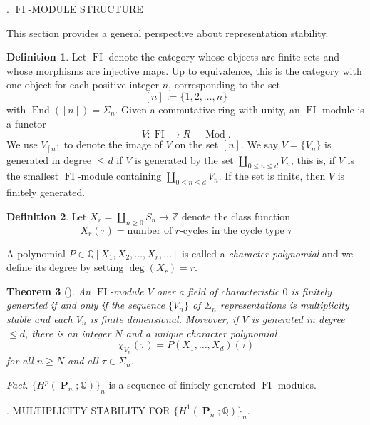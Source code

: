 \documentclass[11pt, letterpaper, notitlepage, oneside]{amsart}
\DeclareMathOperator{\End}{\mathrm{End}}
\DeclareMathOperator{\Mod}{\mathrm{Mod}}
\DeclareMathOperator{\PB}{\mathbf{P}}
\DeclareMathOperator{\F}{\mathrm{FI}}
\newcommand{\bbZ}{\mathbb{Z}}
\newcommand{\bbQ}{\mathbb{Q}}
\theoremstyle{definition}
\newtheorem{definition}{Definition}
\theoremstyle{plain}
\newtheorem{Theorem}[definition]{Theorem}
\begin{document}
. $\F$-MODULE STRUCTURE
\vspace{10pt}

\noindent This section provides a general perspective about representation stability.

\begin{definition}
    Let $\F$ denote the category whose objects are finite sets and whose morphisms are injective maps. Up to equivalence, this is the category with one object for each positive integer $n$, corresponding to the set $$[n]:= \{1,2,\dots, n\}$$
    with $\End([n])= \Sigma_n$. Given a commutative ring with unity, an $\F$-module is a functor $$V: \F\to R-\Mod.$$ 
     We use $V_{[n]}$ to denote the image of $V$ on the set $[n]$. We say $V=\{V_n\}$ is
generated in degree $
\leq d$ if $V$ is generated by the set $\coprod_{0\leq n\leq d} V_n$, this is, if $V$ is the smallest $\F$-module containing $\coprod_{0\leq n\leq d} V_n$. If the set is finite, then $V$ is finitely generated.
     
\end{definition}


\begin{definition}
     Let $X_r= \coprod_{n\geq 0} S_n \to \bbZ$ denote the class function $$X_r(\tau)= \text{number of $r$-cycles in the cycle type $\tau$}$$

     \noindent A polynomial $P\in \bbQ[X_1, X_2, \dots, X_r, \dots]$ is called a \emph{character polynomial} and we define its degree by setting $\deg(X_r)=r$.
\end{definition}

\begin{Theorem}[\cite{CEF14}]
     An $\F$-module $V$  over a field of characteristic $0$ is finitely generated if and only if the sequence $\{V_n\}$ of $\Sigma_n$ representations is multiplicity stable and each $V_n$ is finite dimensional. Moreover, if $V$ is generated in degree $\leq d$, there is an integer $N$ and a unique character polynomial $$\chi_{V_n}(\tau)=P(X_1, \dots, X_d)(\tau)$$
     for all $n\geq N$ and all $\tau\in \Sigma_n$.
\end{Theorem}

\noindent \textit{Fact.} $\{H^p(\PB_n; \bbQ)\}_n$ is a sequence of finitely generated $\F$-modules.


\vspace{10pt}

     . MULTIPLICITY STABILITY FOR $\{H^1(\PB_n; \bbQ)\}_n$.
\vspace{10pt}
\end{document}
